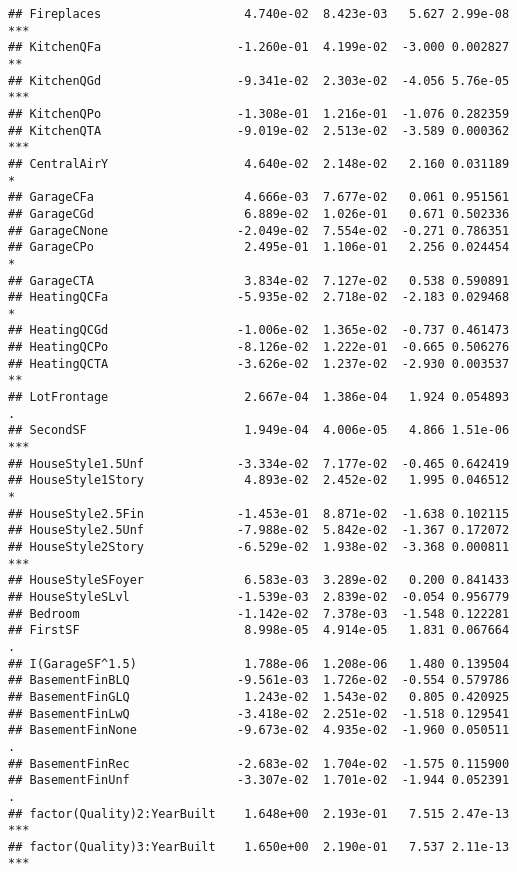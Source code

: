 \documentclass[
]{article}
\begin{document}
\begin{verbatim}
## Fireplaces                    4.740e-02  8.423e-03   5.627 2.99e-08 ***
## KitchenQFa                   -1.260e-01  4.199e-02  -3.000 0.002827 ** 
## KitchenQGd                   -9.341e-02  2.303e-02  -4.056 5.76e-05 ***
## KitchenQPo                   -1.308e-01  1.216e-01  -1.076 0.282359    
## KitchenQTA                   -9.019e-02  2.513e-02  -3.589 0.000362 ***
## CentralAirY                   4.640e-02  2.148e-02   2.160 0.031189 *  
## GarageCFa                     4.666e-03  7.677e-02   0.061 0.951561    
## GarageCGd                     6.889e-02  1.026e-01   0.671 0.502336    
## GarageCNone                  -2.049e-02  7.554e-02  -0.271 0.786351    
## GarageCPo                     2.495e-01  1.106e-01   2.256 0.024454 *  
## GarageCTA                     3.834e-02  7.127e-02   0.538 0.590891    
## HeatingQCFa                  -5.935e-02  2.718e-02  -2.183 0.029468 *  
## HeatingQCGd                  -1.006e-02  1.365e-02  -0.737 0.461473    
## HeatingQCPo                  -8.126e-02  1.222e-01  -0.665 0.506276    
## HeatingQCTA                  -3.626e-02  1.237e-02  -2.930 0.003537 ** 
## LotFrontage                   2.667e-04  1.386e-04   1.924 0.054893 .  
## SecondSF                      1.949e-04  4.006e-05   4.866 1.51e-06 ***
## HouseStyle1.5Unf             -3.334e-02  7.177e-02  -0.465 0.642419    
## HouseStyle1Story              4.893e-02  2.452e-02   1.995 0.046512 *  
## HouseStyle2.5Fin             -1.453e-01  8.871e-02  -1.638 0.102115    
## HouseStyle2.5Unf             -7.988e-02  5.842e-02  -1.367 0.172072    
## HouseStyle2Story             -6.529e-02  1.938e-02  -3.368 0.000811 ***
## HouseStyleSFoyer              6.583e-03  3.289e-02   0.200 0.841433    
## HouseStyleSLvl               -1.539e-03  2.839e-02  -0.054 0.956779    
## Bedroom                      -1.142e-02  7.378e-03  -1.548 0.122281    
## FirstSF                       8.998e-05  4.914e-05   1.831 0.067664 .  
## I(GarageSF^1.5)               1.788e-06  1.208e-06   1.480 0.139504    
## BasementFinBLQ               -9.561e-03  1.726e-02  -0.554 0.579786    
## BasementFinGLQ                1.243e-02  1.543e-02   0.805 0.420925    
## BasementFinLwQ               -3.418e-02  2.251e-02  -1.518 0.129541    
## BasementFinNone              -9.673e-02  4.935e-02  -1.960 0.050511 .  
## BasementFinRec               -2.683e-02  1.704e-02  -1.575 0.115900    
## BasementFinUnf               -3.307e-02  1.701e-02  -1.944 0.052391 .  
## factor(Quality)2:YearBuilt    1.648e+00  2.193e-01   7.515 2.47e-13 ***
## factor(Quality)3:YearBuilt    1.650e+00  2.190e-01   7.537 2.11e-13 ***

\end{verbatim}
\end{document}
